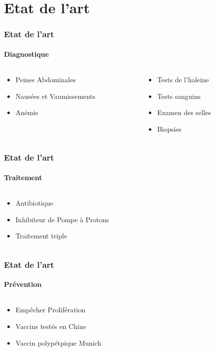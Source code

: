 \documentclass[11pt, notes, handout]{beamer}
\begin{document}
\section{Etat de l'art}
\begin{frame}
\frametitle{Etat de l'art}
\framesubtitle{Diagnostique}
\begin{columns}[c]
	\begin{column}[c]{5cm}
		\begin{itemize}[<+->]
			\item Peines Abdominales
			\item Nausées et Vaumissements
			\item Anémie
		\end{itemize}
	\end{column}
	\begin{column}[c]{5cm}
		\begin{itemize}[<+->]
			\item Tests de l'haleine
			\item Tests sanguins
			\item Examen des selles
			\item Biopsies
		\end{itemize}
	\end{column}
\end{columns}
\end{frame}

\begin{frame}
\frametitle{Etat de l'art}
\framesubtitle{Traitement}
\begin{columns}[c]
	\begin{column}[c]{5cm}
		\begin{itemize}[<+->]
			\item Antibiotique
			\item Inhibiteur de Pompe à Protons
			\item Traitement triple
		\end{itemize}
	\end{column}
	\begin{column}[c]{5cm}
	\end{column}
\end{columns}
\end{frame}

\begin{frame}
\frametitle{Etat de l'art}
\framesubtitle{Prévention}
\begin{columns}[c]
	\begin{column}[c]{5cm}
		\begin{itemize}[<+->]
			\item Empêcher Prolifération
			\item Vaccins testés en Chine
			\item Vaccin polypétpique Munich
		\end{itemize}
	\end{column}
	\begin{column}[c]{5cm}
	\end{column}
\end{columns}
\end{frame}
\end{document}
